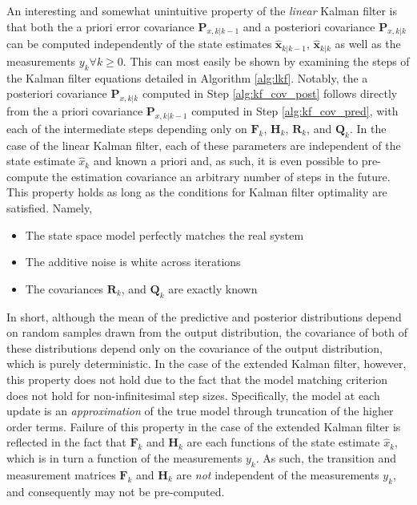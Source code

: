 An interesting and somewhat unintuitive property of the \emph{linear} Kalman filter is that both the a priori error covariance $\mathbf{P}_{x,k|k-1}$ and a posteriori covariance $\mathbf{P}_{x,k|k}$ can be computed independently of the state estimates $\hat{\mathbf{x}}_{k|k-1}$, $\hat{\mathbf{x}}_{k|k}$ as well as the measurements $y_{k} \forall k \geq 0$. This can most easily be shown by examining the steps of the Kalman filter equations detailed in Algorithm \ref{alg:lkf}. Notably, the a posteriori covariance $\mathbf{P}_{x,k|k}$ computed in Step \ref{alg:kf_cov_post} follows directly from the a priori covariance $\mathbf{P}_{x,k|k-1}$ computed in Step \ref{alg:kf_cov_pred}, with each of the intermediate steps depending only on $\mathbf{F}_{k}$, $\mathbf{H}_{k}$,  $\mathbf{R}_{k}$, and $\mathbf{Q}_{k}$. In the case of the linear Kalman filter, each of these parameters are independent of the state estimate $\hat{x}_{k}$ and known a priori and, as such, it is even possible to pre-compute the estimation covariance an arbitrary number of steps in the future. This property holds as long as the conditions for Kalman filter optimality are satisfied. Namely,
\begin{itemize}
    \item \label{alg:kf_cond1} The state space model perfectly matches the real system
    \item The additive noise is white across iterations 
    \item The covariances $\mathbf{R}_{k}$, and $\mathbf{Q}_{k}$ are exactly known
\end{itemize}
In short, although the mean of the predictive and posterior distributions depend on random samples drawn from the output distribution, the covariance of both of these distributions depend only on the covariance of the output distribution, which is purely deterministic. In the case of the extended Kalman filter, however, this property does not hold due to the fact that the model matching criterion does not hold for non-infinitesimal step sizes. Specifically, the model at each update is an \emph{approximation} of the true model through truncation of the higher order terms. Failure of this property in the case of the extended Kalman filter is reflected in the fact that $\mathbf{F}_{k}$ and $\mathbf{H}_{k}$ are each functions of the state estimate $\hat{x}_{k}$, which is in turn a function of the measurements $y_{k}$. As such, the transition and measurement matrices $\mathbf{F}_{k}$ and $\mathbf{H}_{k}$ are \emph{not} independent of the measurements $y_{k}$, and consequently may not be pre-computed.

